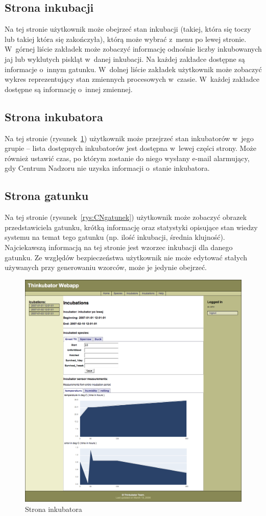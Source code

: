 \subsection{Strona inkubacji}
Na tej stronie użytkownik może obejrzeć stan inkubacji (takiej, która się toczy
lub takiej która się zakończyła), którą może wybrać z~menu po lewej stronie.
W~górnej liście zakładek może zobaczyć informację odnośnie liczby inkubowanych
jaj lub wyklutych piskląt w~danej inkubacji. Na każdej zakładce dostępne są
informacje o~innym gatunku. W~dolnej liście zakładek użytkownik może zobaczyć
wykres reprezentujący stan zmiennych procesowych w~czasie. W~każdej zakładce
dostępne są informację o~innej zmiennej.

\subsection{Strona inkubatora}
Na tej stronie (rysunek~\ref{rys:CNinkubator}) użytkownik może przejrzeć stan inkubatorów w~jego grupie -- lista
dostępnych inkubatorów jest dostępna w~lewej części strony. Może również
ustawić czas, po którym zostanie do niego wysłany e-mail alarmujący,
gdy Centrum Nadzoru nie uzyska informacji o~stanie inkubatora.

\subsection{Strona gatunku}
Na tej stronie (rysunek~\ref{rys:CNgatunek}) użytkownik może zobaczyć obrazek przedstawiciela gatunku, krótką
informację oraz statystyki opisujące stan wiedzy systemu na temat tego gatunku
(np. ilość inkubacji, średnia klujność). Najciekawszą informacją na tej stronie
jest wzorzec inkubacji dla danego gatunku. Ze względów bezpieczeństwa użytkownik
nie może edytować stałych używanych przy generowaniu wzorców, może je jedynie obejrzeć.

\begin{figure}[p] 
\centering\includegraphics[width=.8\textwidth]{figures/CNinkubator}
\caption{Strona inkubatora}\label{rys:CNinkubator}
\end{figure}

